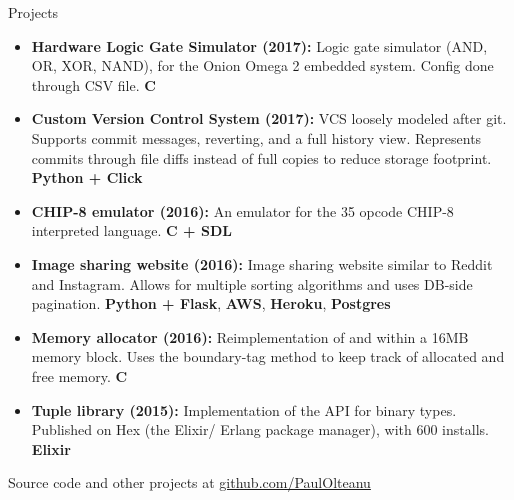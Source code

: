 \documentclass[calibri]{mcdowellcv}
\begin{document}
    \begin{cvsection}{\Large{Projects}}
        \begin{cvsubsection}{}{}{}
            \begin{itemize}
                \item \textbf{Hardware Logic Gate Simulator (2017):} Logic gate simulator (AND, OR, XOR, NAND), for the Onion Omega 2 embedded system. Config done through CSV file. \textbf{C}
                \item \textbf{Custom Version Control System (2017):} VCS loosely modeled after git. Supports commit messages, reverting, and a full history view. Represents commits through file diffs instead of full copies to reduce storage footprint. \textbf{Python + Click}
                \item \textbf{CHIP-8 emulator (2016):} An emulator for the 35 opcode CHIP-8 interpreted language. \textbf{C + SDL}
                \item \textbf{Image sharing website (2016):} Image sharing website similar to Reddit and Instagram. Allows for multiple sorting algorithms and uses DB-side pagination. \textbf{Python + Flask}, \textbf{AWS}, \textbf{Heroku}, \textbf{Postgres}
                \item \textbf{Memory allocator (2016):} Reimplementation of  and  within a 16MB memory block. Uses the boundary-tag method to keep track of allocated and free memory. \textbf{C}
                \item \textbf{Tuple library (2015):} Implementation of the  API for binary types. Published on Hex (the Elixir/ Erlang package manager), with 600 installs. \textbf{Elixir}
            \end{itemize}
            Source code and other projects at \underline{github.com/PaulOlteanu}
        \end{cvsubsection}
    \end{cvsection}
\end{document}
